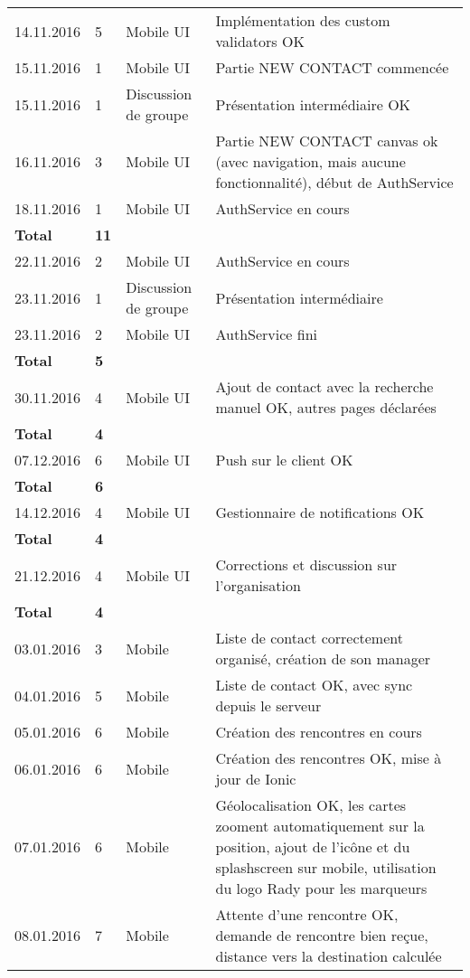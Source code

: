 \documentclass[french]{article}
\begin{document}
\begin{longtable}{p{}|p{}|p{}|p{}}
		\hline
		14.11.2016 & 5 & Mobile UI & Implémentation des custom validators OK\\
		15.11.2016 & 1 & Mobile UI & Partie NEW CONTACT commencée\\
		15.11.2016 & 1 & Discussion de groupe & Présentation intermédiaire OK\\
		16.11.2016 & 3 & Mobile UI & Partie NEW CONTACT canvas ok (avec navigation, mais aucune fonctionnalité), début de AuthService\\
		18.11.2016 & 1 & Mobile UI & AuthService en cours\\
		\textbf{Total} & \textbf{11} &&\\
		\hline
		22.11.2016 & 2 & Mobile UI & AuthService en cours\\
		23.11.2016 & 1 & Discussion de groupe & Présentation intermédiaire\\
		23.11.2016 & 2 & Mobile UI & AuthService fini\\
		\textbf{Total} & \textbf{5} &&\\
		\hline
		30.11.2016 & 4 & Mobile UI & Ajout de contact avec la recherche manuel OK, autres pages déclarées\\
		\textbf{Total} & \textbf{4} &&\\
		\hline
		07.12.2016 & 6 & Mobile UI & Push sur le client OK\\
		\textbf{Total} & \textbf{6} &&\\
		\hline
		14.12.2016 & 4 & Mobile UI & Gestionnaire de notifications OK\\
		\textbf{Total} & \textbf{4} &&\\
		\hline
		21.12.2016 & 4 & Mobile UI & Corrections et discussion sur l'organisation\\
		\textbf{Total} & \textbf{4} &&\\
		\hline
		03.01.2016 & 3 & Mobile & Liste de contact correctement organisé, création de son manager\\
		04.01.2016 & 5 & Mobile & Liste de contact OK, avec sync depuis le serveur\\
		05.01.2016 & 6 & Mobile & Création des rencontres en cours\\
		06.01.2016 & 6 & Mobile & Création des rencontres OK, mise à jour de Ionic\\
		07.01.2016 & 6 & Mobile & Géolocalisation OK, les cartes zooment automatiquement sur la position, ajout de l'icône et du splashscreen sur mobile, utilisation du logo Rady pour les marqueurs\\
		08.01.2016 & 7 & Mobile & Attente d'une rencontre OK, demande de rencontre bien reçue, distance vers la destination calculée\\

\end{longtable}
\end{document}
